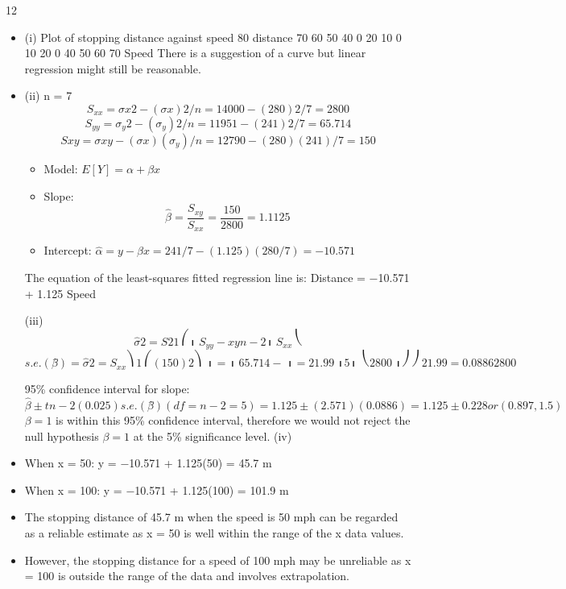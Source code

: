 \documentclass[a4paper,12pt]{article}
\begin{document}
12
\begin{itemize}
\item (i)
Plot of stopping distance against speed
80
distance
70
60
50
40
0
20
10
0
10
20
0
40
50
60
70
Speed
There is a suggestion of a curve but linear regression might still be reasonable.
\item (ii)
n = 7
\[S_{xx} = \sigma x 2 − (\sigma x) 2 /n = 14000 − (280) 2 /7 = 2800\]
\[S_{yy} = \sigma_y 2 − (\sigma_y) 2 /n = 11951 − (241) 2 /7 = 65.714\]
\[S xy = \sigma xy − (\sigma x)( \sigma_y)/n = 12790 − (280)(241)/7 = 150\]
\begin{itemize}
    \item 

Model: $E[Y] = \alpha + \beta x$
\item Slope: \[\hat{\beta} =
\frac{S_{xy}}{S_{xx}} = \frac{150}{2800} = 1.1125\]

\item Intercept: $\hat{\alpha} = y − \hat{\beta} x = 241/7 − (1.125)(280/7) = −10.571$
\end{itemize}
The equation of the least-squares fitted regression line is:
Distance = −10.571 + 1.125 Speed


(iii)
\[\hat{\sigma} 2 =
S 2
1 ⎛
⎜ S_{yy} − xy
n − 2 ⎜
S_{xx}
⎝\]
\[s.e.( \betâ ) =
\hat{\sigma} 2
=
S_{xx}
⎞ 1 ⎛
(150) 2 ⎞
⎟ = ⎜ 65.714 −
⎟ = 21.99
⎟ 5 ⎜ ⎝
2800 ⎟ ⎠
⎠
21.99
= 0.0886
2800\]

95\% confidence interval for slope:
\[\hat{\beta} \pm t n − 2 (0.025) s.e.( \betâ )
(df = n − 2 = 5)
= 1.125 \pm (2.571)(0.0886) = 1.125 \pm 0.228 or (0.897, 1.5)\]
$\beta = 1$ is within this 95\% confidence interval, therefore we would not reject the
null hypothesis $\beta = 1$ at the 5\% significance level.
(iv)
\item When x = 50: y = −10.571 + 1.125(50) = 45.7 m
\item When x = 100: y = −10.571 + 1.125(100) = 101.9 m
\item The stopping distance of 45.7 m when the speed is 50 mph can be regarded as
a reliable estimate as x = 50 is well within the range of the x data values.
\item However, the stopping distance for a speed of 100 mph may be unreliable as
x = 100 is outside the range of the data and involves extrapolation.
\end{itemize}
\end{document}

